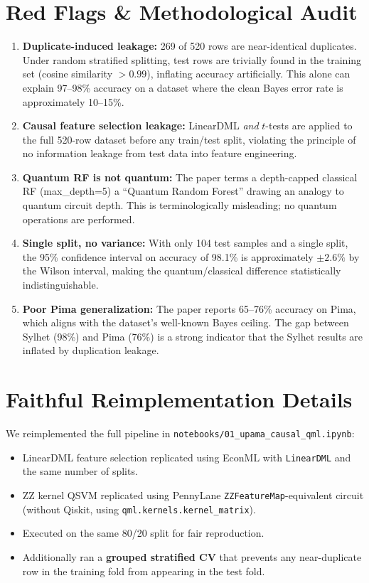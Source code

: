 \documentclass[12pt,a4paper]{article}
\begin{document}
\section{Red Flags \& Methodological Audit}
\begin{enumerate}[leftmargin=*]
  \item \textbf{Duplicate-induced leakage:} 269 of 520 rows are near-identical duplicates. Under random stratified splitting, test rows are trivially found in the training set (cosine similarity $>0.99$), inflating accuracy artificially. This alone can explain 97--98\% accuracy on a dataset where the clean Bayes error rate is approximately 10--15\%.
  \item \textbf{Causal feature selection leakage:} LinearDML \emph{and} $t$-tests are applied to the full 520-row dataset before any train/test split, violating the principle of no information leakage from test data into feature engineering.
  \item \textbf{Quantum RF is not quantum:} The paper terms a depth-capped classical RF (max\_depth=5) a ``Quantum Random Forest'' drawing an analogy to quantum circuit depth. This is terminologically misleading; no quantum operations are performed.
  \item \textbf{Single split, no variance:} With only 104 test samples and a single split, the 95\% confidence interval on accuracy of 98.1\% is approximately $\pm 2.6\%$ by the Wilson interval, making the quantum/classical difference statistically indistinguishable.
  \item \textbf{Poor Pima generalization:} The paper reports 65--76\% accuracy on Pima, which aligns with the dataset's well-known Bayes ceiling. The gap between Sylhet (98\%) and Pima (76\%) is a strong indicator that the Sylhet results are inflated by duplication leakage.
\end{enumerate}

\section{Faithful Reimplementation Details}
We reimplemented the full pipeline in \texttt{notebooks/01\_upama\_causal\_qml.ipynb}:
\begin{itemize}[leftmargin=*]
  \item LinearDML feature selection replicated using EconML with \texttt{LinearDML} and the same number of splits.
  \item ZZ kernel QSVM replicated using PennyLane \texttt{ZZFeatureMap}-equivalent circuit (without Qiskit, using \texttt{qml.kernels.kernel\_matrix}).
  \item Executed on the same 80/20 split for fair reproduction.
  \item Additionally ran a \textbf{grouped stratified CV} that prevents any near-duplicate row in the training fold from appearing in the test fold.
\end{itemize}
\end{document}
